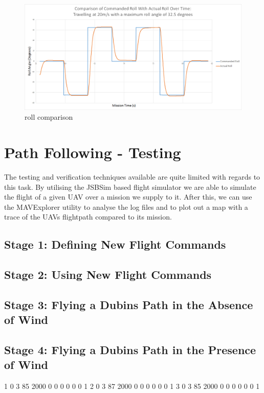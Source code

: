\begin{figure}[htbp!] 
\centering    
\includegraphics[angle=90,origin=c,height=0.7\textheight]{32_20_RollComparison}
\caption[]{roll comparison}
\label{fig:32rollcomparison}
\end{figure}


\section{Path Following - Testing}
\label{task2:testing}

The testing and verification techniques available are quite limited with regards to this task. By utilising the JSBSim based flight simulator we are able to simulate the flight of a given UAV over a mission we supply to it. After this, we can use the MAVExplorer utility to analyse the log files and to plot out a map with a trace of the UAVs flightpath compared to its mission.

\subsection{Stage 1: Defining New Flight Commands}
\label{task2:testing:stage1}

\subsection{Stage 2: Using New Flight Commands}
\label{task2:testing:stage2}

\subsection{Stage 3: Flying a Dubins Path in the Absence of Wind}
\label{task2:testing:stage3}

\subsection{Stage 4: Flying a Dubins Path in the Presence of Wind}
\label{task2:testing:stage4}



1	0	3	85	2000	0	0	0	0	0	0	1
2	0	3	87	2000	0	0	0	0	0	0	1
3	0	3	85	2000	0	0	0	0	0	0	1
